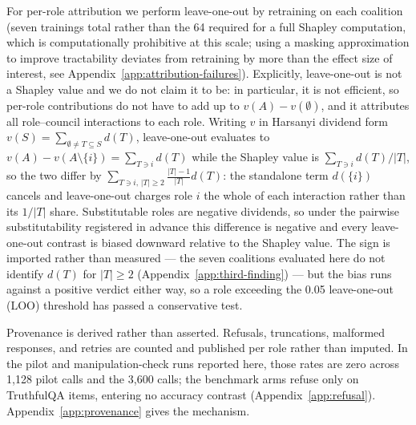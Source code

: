 For per-role attribution we perform leave-one-out by retraining on each coalition (seven trainings
total rather than the 64 required for a full Shapley computation, which is computationally
prohibitive at this scale; using a masking approximation to improve tractability deviates from
retraining by more than the effect size of interest, see Appendix~\ref{app:attribution-failures}).
Explicitly, leave-one-out is not a Shapley value and we do not claim it to be: in particular, it is
not efficient, so per-role contributions do not have to add up to $v(A) - v(\emptyset)$, and it
attributes all role--council interactions to each role. Writing $v$ in Harsanyi dividend form
$v(S) = \sum_{\emptyset \ne T \subseteq S} d(T)$, leave-one-out evaluates to
$v(A) - v(A \setminus \{i\}) = \sum_{T \ni i} d(T)$ while the Shapley value is
$\sum_{T \ni i} d(T)/|T|$, so the two differ by
$\sum_{T \ni i,\, |T| \ge 2} \frac{|T|-1}{|T|} d(T)$: the standalone term $d(\{i\})$ cancels and
leave-one-out charges role $i$ the whole of each interaction rather than its $1/|T|$ share.
Substitutable roles are negative dividends, so under the pairwise substitutability registered in
advance this difference is negative and every leave-one-out contrast is biased downward relative to
the Shapley value. The sign is imported rather than measured --- the seven coalitions evaluated here
do not identify $d(T)$ for $|T| \ge 2$ (Appendix~\ref{app:third-finding}) --- but the bias runs
against a positive verdict either way, so a role exceeding the 0.05 leave-one-out (LOO) threshold
has passed a conservative test.

Provenance is derived rather than asserted. Refusals, truncations, malformed responses, and retries
are counted and published per role rather than imputed. In the pilot and manipulation-check runs
reported here, those rates are zero across 1,128 pilot calls and the 3,600 calls; the benchmark arms
refuse only on TruthfulQA items, entering no accuracy contrast (Appendix~\ref{app:refusal}).
Appendix~\ref{app:provenance} gives the mechanism.
